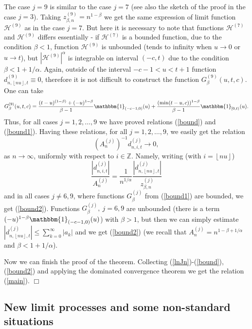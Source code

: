 \documentclass[12pt]{article}
\def\bz{{\bf Z}}
\def\bz{{\mathbb Z}} %
\def\a{\alpha}
\def\b{\beta}
\def\H{{\mathscr H}}
\newcommand{\ind}[1]{\mathbbm{1}_{#1}}
\newcommand{\sv}[1]{\left\lfloor #1 \right\rfloor}
\newcommand{\halmos}{\vspace{3mm} \hfill \mbox{$\Box$}\\[2mm]}
\theoremstyle{plain}
\theoremstyle{definition}
\begin{document}
The case $j=9$ is similar to the case $j=7$ (see also the sketch of the proof in the case $j=3$). Taking $z_{\b, n}^{(9)}=n^{1-\b}$   we get the same expression of limit function $\H^{(9)}$ as in the case $j=7$. But here it is necessary to note that functions $\H^{(7)}$ and $\H^{(9)}$ differs essentially - if $\H^{(7)}$ is a bounded function, due to the condition $\b<1$, function $\H^{(9)}$ is unbounded (tends to infinity when $u\to 0$ or $u\to t$), but $|\H^{(9)}|^\a$  is integrable  on  interval $(-c, t)$ due to the condition $\b<1+1/\a$. Again,  outside of the interval $-c-1<u<t+1$ function $d_{n, \sv{nu}, t}^{(9)}\equiv 0$, therefore it is not difficult to construct the function $G_{\b}^{(9)}(u,t,c)$. One can take
$$
G_{\b}^{(9)}(u,t,c)=\frac{(t-u)^{(1-\b)}+(-u)^{1-\b}}{\b-1}\ind{(-c-1, 0)}(u)+ \frac{(\min (t-u, c))^{1-\b}}{\b-1}\ind{[0, t)}(u).
$$
Thus, for all cases  $j=1, 2, \dots, 9$ we have proved  relations (\ref{bound}) and (\ref{bound1}). Having these relations, for all $j=1, 2, \dots, 9$, we easily get the relation
\begin{equation}\label{bound2}
(A_{n}^{(j)})^{-1}d_{n, i, t}^{(j)} \to 0,
\end{equation}
as $n\to \infty$, uniformly with respect to $i\in \bz$. Namely, writing (with $i=\sv{nu}$)
$$
\frac{|d_{n, i, t}^{(j)}|}{A_{n}^{(j)}}=\frac{1}{n^{1/\a}}\frac{|d_{n, \sv{nu}, t}^{(j)}|}{z_{\b, n}^{(j)}}
$$
and in all cases $j\ne 6, 9$, where functions $G_{\b}^{(j)}$ from (\ref{bound1}) are bounded, we get (\ref{bound2}). Functions $G_{\b}^{(j)}, \ j=6, 9$ are unbounded (there is a term $(-u)^{1-\b}\ind{(-c-1, 0)}(u)$) with $\b>1$, but then we can simply estimate $|d_{n, \sv{nu}, t}^{(j)}|\le \sum_{k=0}^\infty |a_k|$ and we  get (\ref{bound2}) (we recall that $A_{n}^{(j)}=n^{1-\b+1/\a}$ and $\b<1+1/\a$).

Now we can finish the proof of the theorem. Collecting (\ref{lnJn})-(\ref{bound}),  (\ref{bound2}) and applying the dominated convergence theorem we get the relation (\ref{main}).
\halmos


\subsection{New limit processes and some non-standard situations}
\end{document}
